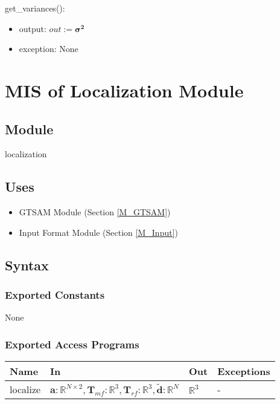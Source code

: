 \documentclass[12pt, titlepage]{article}
\begin{document}
\noindent get\_variances():
\begin{itemize}
    \item output: $out:=\boldsymbol{\sigma^2}$
    \item exception: None
\end{itemize}


\newpage


\section{MIS of Localization Module} \label{M_Localize}

\subsection{Module}

localization

\subsection{Uses}
\begin{itemize}
  \item GTSAM Module (Section \ref{M_GTSAM})
  \item Input Format Module (Section \ref{M_Input})
  
\end{itemize}
\subsection{Syntax}

\subsubsection{Exported Constants}
None

\subsubsection{Exported Access Programs}

\begin{center}
\begin{tabular}{p{2cm} p{7cm} p{4cm} p{3cm}}
\hline
\textbf{Name} & \textbf{In} & \textbf{Out} & \textbf{Exceptions} \\
\hline
localize & $\mathbf{a}:\mathbb{R}^{N \times 2}, \mathbf{T}_{mf}:\mathbb{R}^3, \mathbf{T}_{rf}: \mathbb{R}^3,\mathbf{\tilde{d}}:\mathbb{R}^N$ & $\mathbb{R}^3$ & - \\
\hline
\end{tabular}
\end{center}
\end{document}
